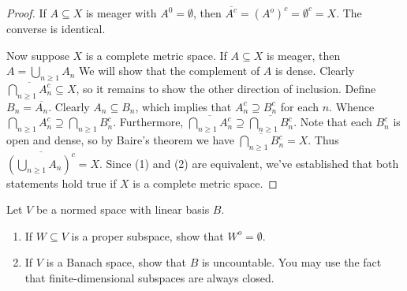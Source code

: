 \documentclass[11pt,twoside,openany]{memoir}
\begin{document}
        \begin{proof}
            If $A \subseteq X$ is meager with $A^0 = \emptyset$, then $\overline{A^c} = (A^o)^c = \emptyset^c = X$. The converse is identical.

            Now suppose $X$ is a complete metric space. If $A \subseteq X$ is meager, then $A = \bigcup_{n \geq 1}A_n$ We will show that the complement of $A$ is dense. Clearly $\overline{\bigcap_{n \geq 1}A_n^c} \subseteq X$, so it remains to show the other direction of inclusion. Define $B_n = \overline{A_n}$. Clearly $A_n \subseteq B_n$, which implies that $A_n^c \supseteq B_n^c$ for each $n$. Whence $\bigcap_{n \geq 1}A_n^c \supseteq \bigcap_{n \geq 1}B_n^c$. Furthermore, $\overline{\bigcap_{n \geq 1}A_n^c} \supseteq \overline{\bigcap_{n \geq 1}B_n^c}$. Note that each $B_n^c$ is open and dense, so by Baire's theorem we have $\overline{\bigcap_{n \geq 1}B_n^c} = X$. Thus $\overline{\left(\bigcup_{n \geq 1}A_n\right)^c} = X$. Since (1) and (2) are equivalent, we've established that both statements hold true if $X$ is a complete metric space.
        \end{proof}
    \newpage
    \begin{exercise}
        Let $V$ be a normed space with linear basis $B$.
        \begin{enumerate}[label = (\arabic*),itemsep=1pt,topsep=3pt]
            \item If $W \subseteq V$ is a proper subspace, show that $W^o = \emptyset$.
            \item If $V$ is a Banach space, show that $B$ is uncountable. You may use the fact that finite-dimensional subspaces are always closed.
        \end{enumerate}
    \end{exercise}
\end{document}
